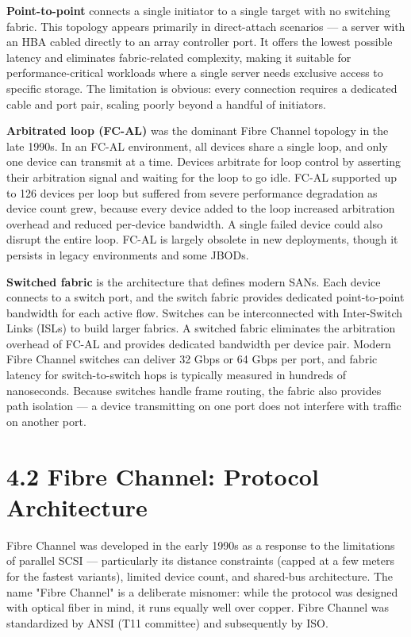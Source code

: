 \textbf{Point-to-point} connects a single initiator to a single target with no switching fabric. This topology appears primarily in direct-attach scenarios --- a server with an HBA cabled directly to an array controller port. It offers the lowest possible latency and eliminates fabric-related complexity, making it suitable for performance-critical workloads where a single server needs exclusive access to specific storage. The limitation is obvious: every connection requires a dedicated cable and port pair, scaling poorly beyond a handful of initiators.

\textbf{Arbitrated loop (FC-AL)} was the dominant Fibre Channel topology in the late 1990s. In an FC-AL environment, all devices share a single loop, and only one device can transmit at a time. Devices arbitrate for loop control by asserting their arbitration signal and waiting for the loop to go idle. FC-AL supported up to 126 devices per loop but suffered from severe performance degradation as device count grew, because every device added to the loop increased arbitration overhead and reduced per-device bandwidth. A single failed device could also disrupt the entire loop. FC-AL is largely obsolete in new deployments, though it persists in legacy environments and some JBODs.

\textbf{Switched fabric} is the architecture that defines modern SANs. Each device connects to a switch port, and the switch fabric provides dedicated point-to-point bandwidth for each active flow. Switches can be interconnected with Inter-Switch Links (ISLs) to build larger fabrics. A switched fabric eliminates the arbitration overhead of FC-AL and provides dedicated bandwidth per device pair. Modern Fibre Channel switches can deliver 32 Gbps or 64 Gbps per port, and fabric latency for switch-to-switch hops is typically measured in hundreds of nanoseconds. Because switches handle frame routing, the fabric also provides path isolation --- a device transmitting on one port does not interfere with traffic on another port.

\section{4.2 Fibre Channel: Protocol Architecture}
Fibre Channel was developed in the early 1990s as a response to the limitations of parallel SCSI --- particularly its distance constraints (capped at a few meters for the fastest variants), limited device count, and shared-bus architecture. The name "Fibre Channel" is a deliberate misnomer: while the protocol was designed with optical fiber in mind, it runs equally well over copper. Fibre Channel was standardized by ANSI (T11 committee) and subsequently by ISO.

